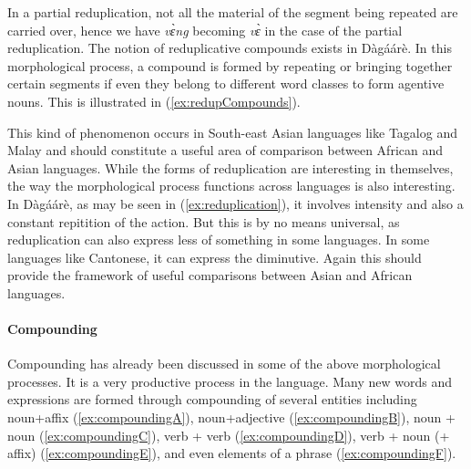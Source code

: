 
In a partial reduplication, not all the material of the segment being repeated are carried over,
hence we have \textit{vɛ̀ng} becoming \textit{vɛ̀} in the case of the partial reduplication.
The notion of reduplicative compounds exists in Dàgáárè. In this morphological process, a
compound is formed by repeating or bringing together certain segments if even they belong to
different word classes to form agentive nouns. This is illustrated in (\ref{ex:redupCompounds}).




This kind of phenomenon occurs in South-east Asian languages like Tagalog and Malay and should constitute a useful area of comparison between African and Asian languages. While the forms of reduplication are interesting in themselves, the way the
morphological process functions across languages is also interesting. In Dàgáárè, as may be
seen in (\ref{ex:reduplication}), it involves intensity and also a constant repitition of the action. But this is by no
means universal, as reduplication can also express less of something in some languages. In
some languages like Cantonese, it can express the diminutive. Again this should provide the
framework of useful comparisons between Asian and African languages.

\paragraph{Compounding}
Compounding has already been discussed in some of the above morphological
processes. It is a very productive process in the language. Many new words and expressions are formed through compounding of several entities including noun+affix (\ref{ex:compoundingA}),
noun+adjective (\ref{ex:compoundingB}), noun + noun (\ref{ex:compoundingC}), verb + verb (\ref{ex:compoundingD}), verb + noun (+ affix) (\ref{ex:compoundingE}), and
even elements of a phrase (\ref{ex:compoundingF}).

